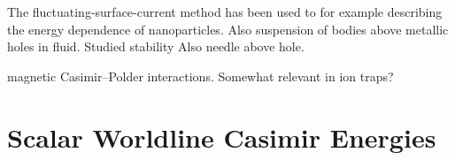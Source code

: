 The fluctuating-surface-current method has been used to 
for example describing the energy dependence of nanoparticles.
\cite{Levin2010,Rodriguez2013} Also suspension of bodies above metallic holes in fluid.  Studied stability
Also needle above hole.  



\cite{Haakh2009} magnetic Casimir--Polder interactions.  Somewhat relevant in ion traps?









\section{Scalar Worldline Casimir Energies}

